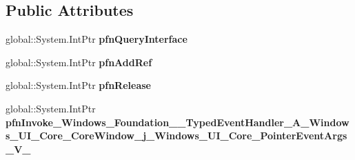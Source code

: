 \subsection*{Public Attributes}
\begin{DoxyCompactItemize}
\item 
\mbox{\label{struct_windows_1_1_foundation_1_1_typed_event_handler___a___windows___u_i___core___core_window__9847d8e12b1e96286fbe9b33a69b897e_aee045efa0c84249418723c4dec0fe4ea}} 
global\+::\+System.\+Int\+Ptr {\bfseries pfn\+Query\+Interface}
\item 
\mbox{\label{struct_windows_1_1_foundation_1_1_typed_event_handler___a___windows___u_i___core___core_window__9847d8e12b1e96286fbe9b33a69b897e_a73b9c2c9993fe70d1a09c2980c18831f}} 
global\+::\+System.\+Int\+Ptr {\bfseries pfn\+Add\+Ref}
\item 
\mbox{\label{struct_windows_1_1_foundation_1_1_typed_event_handler___a___windows___u_i___core___core_window__9847d8e12b1e96286fbe9b33a69b897e_a8434a2037759df2bd458f1a13b91c833}} 
global\+::\+System.\+Int\+Ptr {\bfseries pfn\+Release}
\item 
\mbox{\label{struct_windows_1_1_foundation_1_1_typed_event_handler___a___windows___u_i___core___core_window__9847d8e12b1e96286fbe9b33a69b897e_a4d065ef006b6ebb7a5229eeb0f1fd202}} 
global\+::\+System.\+Int\+Ptr {\bfseries pfn\+Invoke\+\_\+\+Windows\+\_\+\+Foundation\+\_\+\+\_\+\+Typed\+Event\+Handler\+\_\+\+A\+\_\+\+Windows\+\_\+\+U\+I\+\_\+\+Core\+\_\+\+Core\+Window\+\_\+j\+\_\+\+Windows\+\_\+\+U\+I\+\_\+\+Core\+\_\+\+Pointer\+Event\+Args\+\_\+\+V\+\_\+}
\end{DoxyCompactItemize}
